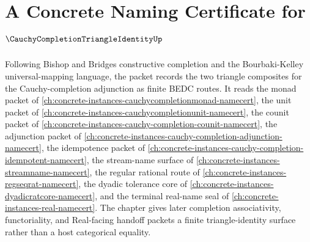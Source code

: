 \chapter{A Concrete Naming Certificate for $\CauchyCompletionTriangleIdentityUp$}
\label{ch:concrete-instances-cauchy-completion-triangle-identity-namecert}

Following Bishop and Bridges constructive completion and the Bourbaki-Kelley universal-mapping language, the packet records the two triangle composites for the Cauchy-completion adjunction as finite BEDC routes. It reads the monad packet of \autoref{ch:concrete-instances-cauchycompletionmonad-namecert}, the unit packet of \autoref{ch:concrete-instances-cauchycompletionunit-namecert}, the counit packet of \autoref{ch:concrete-instances-cauchy-completion-counit-namecert}, the adjunction packet of \autoref{ch:concrete-instances-cauchy-completion-adjunction-namecert}, the idempotence packet of \autoref{ch:concrete-instances-cauchy-completion-idempotent-namecert}, the stream-name surface of \autoref{ch:concrete-instances-streamname-namecert}, the regular rational route of \autoref{ch:concrete-instances-regseqrat-namecert}, the dyadic tolerance core of \autoref{ch:concrete-instances-dyadicratcore-namecert}, and the terminal real-name seal of \autoref{ch:concrete-instances-real-namecert}. The chapter gives later completion associativity, functoriality, and Real-facing handoff packets a finite triangle-identity surface rather than a host categorical equality.


